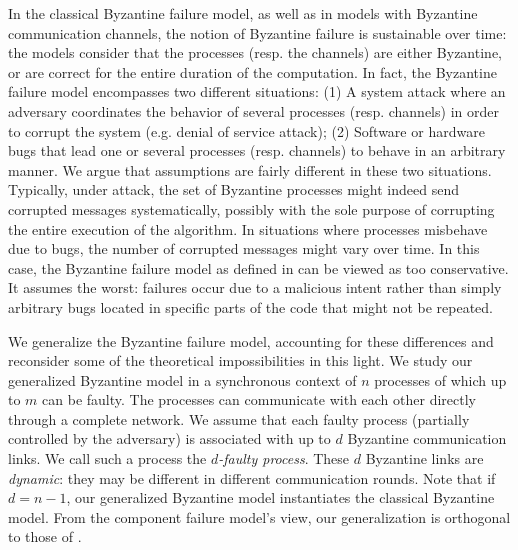 \documentclass[11pt,letterpaper]{article}
\newcommand{\tmem}[1]{{\em #1\/}}
\begin{document}
In the classical Byzantine failure model, as well as in models with Byzantine communication channels, the notion of Byzantine failure is sustainable over time: the models consider that the processes (resp. the channels) are either Byzantine, or are correct for the entire duration of the computation. In fact, the Byzantine failure model encompasses two different situations: (1) A system attack where an adversary coordinates the behavior of several processes (resp. channels) in order to corrupt the system (e.g. denial of service attack); (2) Software or hardware bugs that lead one or several processes (resp. channels) to behave in an arbitrary manner.
We argue that
assumptions are fairly different in these two situations. Typically, under
attack, the set of Byzantine processes might indeed send corrupted messages systematically, possibly
with the sole purpose of corrupting the entire execution of the algorithm. In situations where processes misbehave due to bugs, the number of corrupted messages might vary over time. In this case, the Byzantine failure model as defined in \cite{lamport1982byzantine,pease1980reaching} can be viewed as too conservative. It assumes the worst: failures occur due to a malicious intent rather than simply arbitrary bugs located in specific parts of the code that might not be
repeated.

We generalize the Byzantine failure model, accounting
for these differences and reconsider some of the theoretical impossibilities in
this light. We study our generalized Byzantine model in a synchronous context
of $n$
processes of which up to $m$ can be faulty. The processes can
communicate with each other directly through a complete network.
We assume that each faulty process (partially controlled by
the adversary) is associated with up to $d$ Byzantine communication
links. We call such a process the
{\tmem{$d$-faulty process}}.
These $d$ Byzantine links are \tmem{dynamic}: they may be
different in different communication rounds.
Note that if $d=n-1$, our generalized Byzantine model instantiates the classical Byzantine model. From the component failure model's view, our generalization is orthogonal to those of \cite{tseng2013iterative,santoro2007agreement,amitanand2003distributed}.
\end{document}
